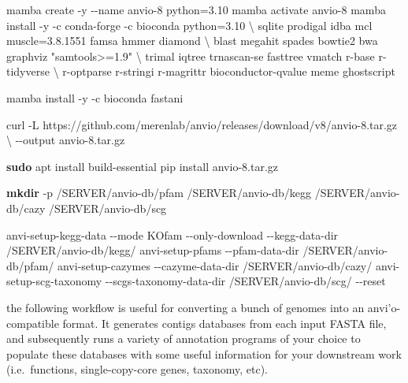 \documentclass[
]{book}
\newenvironment{Shaded}{\begin{snugshade}}{\end{snugshade}}
\newcommand{\AttributeTok}[1]{\textcolor[rgb]{0.13,0.29,0.53}{#1}}
\newcommand{\DataTypeTok}[1]{\textcolor[rgb]{0.13,0.29,0.53}{#1}}
\newcommand{\ExtensionTok}[1]{#1}
\newcommand{\FunctionTok}[1]{\textcolor[rgb]{0.13,0.29,0.53}{\textbf{#1}}}
\newcommand{\NormalTok}[1]{#1}
\newcommand{\StringTok}[1]{\textcolor[rgb]{0.31,0.60,0.02}{#1}}
\begin{document}
\begin{Shaded}
\begin{Highlighting}[]
\ExtensionTok{mamba}\NormalTok{ create }\AttributeTok{{-}y} \AttributeTok{{-}{-}name}\NormalTok{ anvio{-}8 python=3.10}
\ExtensionTok{mamba}\NormalTok{ activate anvio{-}8}
\ExtensionTok{mamba}\NormalTok{ install }\AttributeTok{{-}y} \AttributeTok{{-}c}\NormalTok{ conda{-}forge }\AttributeTok{{-}c}\NormalTok{ bioconda python=3.10 }\DataTypeTok{\textbackslash{}}
\NormalTok{        sqlite prodigal idba mcl muscle=3.8.1551 famsa hmmer diamond }\DataTypeTok{\textbackslash{}}
\NormalTok{        blast megahit spades bowtie2 bwa graphviz }\StringTok{"samtools\textgreater{}=1.9"} \DataTypeTok{\textbackslash{}}
\NormalTok{        trimal iqtree trnascan{-}se fasttree vmatch r{-}base r{-}tidyverse }\DataTypeTok{\textbackslash{}}
\NormalTok{        r{-}optparse r{-}stringi r{-}magrittr bioconductor{-}qvalue meme ghostscript}
        
\ExtensionTok{mamba}\NormalTok{ install }\AttributeTok{{-}y} \AttributeTok{{-}c}\NormalTok{ bioconda fastani}

\ExtensionTok{curl} \AttributeTok{{-}L}\NormalTok{ https://github.com/merenlab/anvio/releases/download/v8/anvio{-}8.tar.gz }\DataTypeTok{\textbackslash{}}
        \AttributeTok{{-}{-}output}\NormalTok{ anvio{-}8.tar.gz}
       
\FunctionTok{sudo}\NormalTok{ apt install build{-}essential}
\ExtensionTok{pip}\NormalTok{ install anvio{-}8.tar.gz}


\FunctionTok{mkdir} \AttributeTok{{-}p}\NormalTok{ /SERVER/anvio{-}db/pfam /SERVER/anvio{-}db/kegg /SERVER/anvio{-}db/cazy /SERVER/anvio{-}db/scg       }

\ExtensionTok{anvi{-}setup{-}kegg{-}data} \AttributeTok{{-}{-}mode}\NormalTok{ KOfam }\AttributeTok{{-}{-}only{-}download} \AttributeTok{{-}{-}kegg{-}data{-}dir}\NormalTok{ /SERVER/anvio{-}db/kegg/}
\ExtensionTok{anvi{-}setup{-}pfams} \AttributeTok{{-}{-}pfam{-}data{-}dir}\NormalTok{ /SERVER/anvio{-}db/pfam/}
\ExtensionTok{anvi{-}setup{-}cazymes} \AttributeTok{{-}{-}cazyme{-}data{-}dir}\NormalTok{ /SERVER/anvio{-}db/cazy/}
\ExtensionTok{anvi{-}setup{-}scg{-}taxonomy} \AttributeTok{{-}{-}scgs{-}taxonomy{-}data{-}dir}\NormalTok{ /SERVER/anvio{-}db/scg/ }\AttributeTok{{-}{-}reset}
\end{Highlighting}
\end{Shaded}

the following workflow is useful for converting a bunch of genomes into an anvi'o-compatible format. It generates contigs databases from each input FASTA file, and subsequently runs a variety of annotation programs of your choice to populate these databases with some useful information for your downstream work (i.e.~functions, single-copy-core genes, taxonomy, etc).
\end{document}
